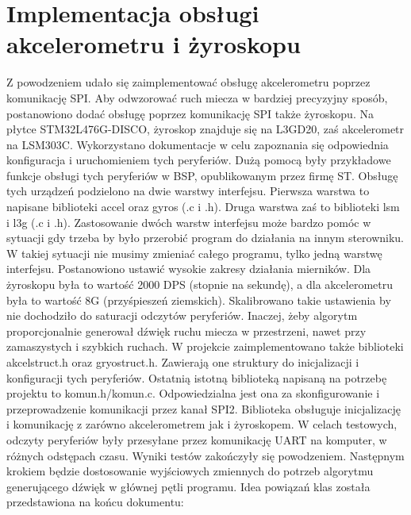 \documentclass[10pt, a4paper]{article}
\begin{document}
	\section{Implementacja obsługi akcelerometru i żyroskopu}
	Z powodzeniem udało się zaimplementować obsługę akcelerometru poprzez komunikację SPI. Aby odwzorować ruch miecza w bardziej precyzyjny sposób, postanowiono dodać obsługę poprzez komunikację SPI także żyroskopu. Na płytce STM32L476G-DISCO, żyroskop znajduje się na L3GD20, zaś akcelerometr na LSM303C. Wykorzystano dokumentacje w celu zapoznania się odpowiednia konfiguracja i uruchomieniem tych peryferiów. Dużą pomocą były przykładowe funkcje obsługi tych peryferiów w BSP, opublikowanym przez firmę ST. Obsługę tych urządzeń podzielono na dwie warstwy interfejsu. Pierwsza warstwa to napisane biblioteki accel oraz gyros (.c i .h). Druga warstwa zaś to biblioteki lsm i l3g (.c i .h). Zastosowanie dwóch warstw interfejsu może bardzo pomóc w sytuacji gdy trzeba by było przerobić program do działania na innym sterowniku. W takiej sytuacji nie musimy zmieniać całego programu, tylko jedną warstwę interfejsu. 
Postanowiono ustawić wysokie zakresy działania mierników. Dla żyroskopu była to wartość 2000 DPS (stopnie na sekundę), a dla akcelerometru była to wartość 8G (przyśpieszeń ziemskich). Skalibrowano takie ustawienia by nie dochodziło do saturacji odczytów peryferiów. Inaczej, żeby algorytm proporcjonalnie generował dźwięk ruchu miecza w przestrzeni, nawet przy zamaszystych i szybkich ruchach. 
W projekcie zaimplementowano także biblioteki akcelstruct.h oraz gryostruct.h. Zawierają one struktury do inicjalizacji i konfiguracji tych peryferiów. Ostatnią istotną biblioteką napisaną na potrzebę projektu to komun.h/komun.c. Odpowiedzialna jest ona za skonfigurowanie i przeprowadzenie komunikacji przez kanał SPI2. Biblioteka obsługuje inicjalizację i komunikację z zarówno akcelerometrem jak i żyroskopem. 
W celach testowych, odczyty peryferiów były przesyłane przez komunikację UART na komputer, w różnych odstępach czasu. Wyniki testów zakończyły się powodzeniem. Następnym krokiem będzie dostosowanie wyjściowych zmiennych do potrzeb algorytmu generującego dźwięk w głównej pętli programu. 
Idea powiązań klas została przedstawiona na końcu dokumentu:
\end{document}
